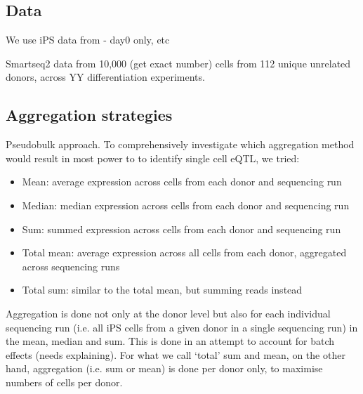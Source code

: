

\subsection{Data}

We use iPS data from \cite{cuomo2020single} - day0 only, etc

Smartseq2 \cite{picelli2013smart} data from 10,000 (get exact number) cells from 112 unique unrelated donors, across YY differentiation experiments. 

\subsection{Aggregation strategies}

Pseudobulk approach.
To comprehensively investigate which aggregation method would result in most power to to identify single cell eQTL, we tried:

\begin{itemize}
    \item Mean: average expression across cells from each donor and sequencing run
    \item Median: median expression across cells from each donor and sequencing run
    \item Sum: summed expression across cells from each donor and sequencing run
    \item Total mean: average expression across all cells from each donor, aggregated across sequencing runs
    \item Total sum: similar to the total mean, but summing reads instead
\end{itemize}

Aggregation is done not only at the donor level but also for each individual sequencing run (i.e. all iPS cells from a given donor in a single sequencing run) in the mean, median and sum.
This is done in an attempt to account for batch effects (needs explaining).
For what we call `total' sum and mean, on the other hand, aggregation (i.e. sum or mean) is done per donor only, to maximise numbers of cells per donor.\\


